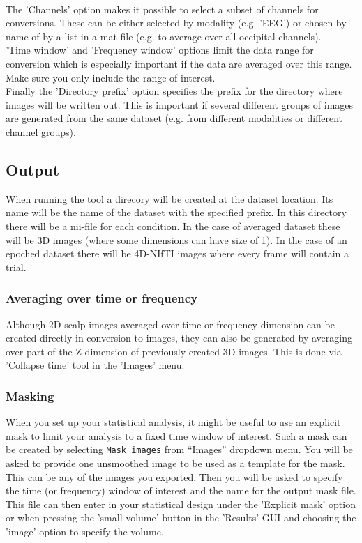 \\
The 'Channels' option makes it possible to select a subset of channels for conversions. These can be either selected by modality (e.g. 'EEG') or chosen by name of by a list in a mat-file (e.g. to average over all occipital channels). 
\\
'Time window' and 'Frequency window' options limit the data range for conversion which is especially important if the data are averaged over this range. Make sure you only include the range of interest.
\\
Finally the 'Directory prefix' option specifies the prefix for the directory where images will be written out. This is important if several different groups of images are generated from the same dataset (e.g. from different modalities or different channel groups).
\\
\subsection{Output}
 When running the tool a direcory will be created at the dataset location. Its name will be the name of the dataset with the specified prefix. In this directory there will be a nii-file for each condition. In the case of averaged dataset these will be 3D images (where some dimensions can have size of 1). In the case of an epoched dataset there will be 4D-NIfTI images where every frame will contain a trial. 
\\
\subsubsection{Averaging over time or frequency}
Although 2D scalp images averaged over time or frequency dimension can be created directly in conversion to images, they can also be generated by averaging over part of the Z dimension of previously created 3D images. This is done via 'Collapse time' tool in the 'Images' menu. 
\\
\subsubsection{Masking}
When you set up your statistical analysis, it might be useful to use an explicit mask to limit your analysis to a fixed time window of interest. Such a mask can be created by selecting \texttt{Mask images} from ``Images'' dropdown menu. You will be asked to provide one unsmoothed image to be used as a template for the mask. This can be any of the images you exported. Then you will be asked to specify the time (or frequency) window of interest and the name for the output mask file. This file can then enter in your statistical design under the 'Explicit mask' option or when pressing the 'small volume' button in the 'Results' GUI and choosing the 'image' option to specify the volume.
\\

